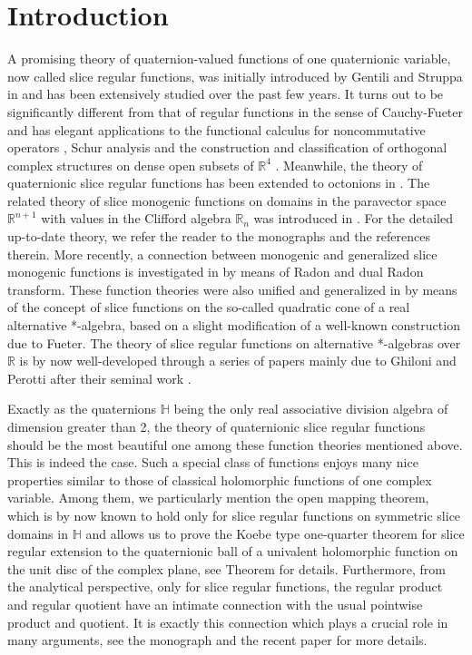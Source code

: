 \documentclass{amsart}
\theoremstyle{definition}
\theoremstyle{remark}
\numberwithin{equation}{section}
\begin{document}
\section{Introduction}
A promising theory of quaternion-valued functions of one quaternionic variable, now called slice regular functions, was initially introduced by Gentili and Struppa in \cite{GS1, GS2} and has been extensively studied over the past few years. It turns out to be significantly different from that of regular functions in the sense of Cauchy-Fueter and has  elegant applications to the functional calculus for noncommutative operators \cite{Co2}, Schur analysis \cite{ACS} and the construction and classification of orthogonal complex structures on dense open subsets of $\mathbb R^4$ \cite{GSS2014}.  Meanwhile, the theory of quaternionic slice regular functions has been extended to octonions in \cite{GS50}. The related theory of slice monogenic functions on domains in the paravector space $\mathbb R^{n+1}$ with values in the Clifford algebra $\mathbb R_n$ was introduced in \cite{Co6,Co3}. For the detailed up-to-date theory, we refer the reader to the monographs \cite{GSS, Co2} and the references therein. More recently, a connection between monogenic
and generalized slice monogenic functions is investigated in \cite{CLSS} by means of  Radon and dual Radon transform. These function theories were also unified and generalized in \cite{Ghiloni1} by means of the concept of slice functions on the so-called quadratic cone of a real alternative *-algebra, based on a  slight modification of a well-known construction due to Fueter. The theory of slice regular functions on  alternative *-algebras over $\mathbb R$ is by now well-developed through a series of papers \cite{Ghiloni5, Ghiloni3,Ghiloni4,Ghiloni6,Ghiloni7} mainly due to Ghiloni and Perotti after their seminal work \cite{Ghiloni1}.

Exactly as the quaternions $\mathbb H$ being the only real associative division algebra of dimension greater than 2, the theory of quaternionic slice regular functions should be the most beautiful one  among these function theories mentioned above. This is indeed the case. Such a special class of functions enjoys many nice properties similar to those of classical holomorphic functions of one complex variable.
Among them, we particularly mention the open mapping theorem, which is by now  known to hold only for slice regular functions on symmetric slice domains in $\mathbb H$ and allows us to prove the Koebe type one-quarter theorem for slice regular extension to the  quaternionic ball of a univalent holomorphic function on the unit disc of the complex plane, see Theorem \cite[Theorem 4.9]{RW2} for details. Furthermore, from  the analytical perspective, only for slice regular functions, the regular product and regular quotient have  an intimate connection with the usual pointwise product and quotient. It is exactly this connection which plays a crucial role in many arguments, see the monograph \cite{GSS} and the recent paper \cite{WR} for more details.
\end{document}
